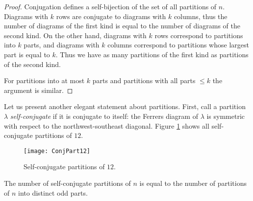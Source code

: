 \begin{page}
\setcounter{section}{3}
\setcounter{subsection}{6}
\setcounter{dfn}{15}
\label{portion:830}

\begin{proof}
Conjugation defines a self-bijection of the set of all partitions of $n$.
Diagrams with $k$ rows are conjugate to diagrams with $k$ columns,
thus the number of diagrams of the first kind is equal to the number of diagrams of the second kind.
On the other hand, diagrams with $k$ rows correspond to partitions into $k$ parts,
and diagrams with $k$ columns correspond to partitions whose largest part is equal to $k$.
Thus we have as many partitions of the first kind as partitions of the second kind.

For partitions into at most $k$ parts and partitions with all parts $\le k$ the argument is similar.
\end{proof}


Let us present another elegant statement about partitions.
First, call a partition $\lambda$ \emph{self-conjugate} if it is conjugate to itself:
the Ferrers diagram of $\lambda$ is symmetric with respect to the northwest-southeast diagonal.
Figure \ref{fig:FerrersSelfConj} shows all self-conjugate partitions of $12$.

\begin{figure}[ht]
\begin{center}
\texttt{[image: ConjPart12]}
\end{center}
\caption{Self-conjugate partitions of $12$.}
\label{fig:FerrersSelfConj}
\end{figure}



\end{page}

\begin{page}
\setcounter{section}{3}
\setcounter{subsection}{6}
\setcounter{dfn}{16}
\label{portion:832}

\begin{thm}
The number of self-conjugate partitions of $n$ is equal to the number of partitions of $n$ into distinct odd parts.
\end{thm}

\end{page}

